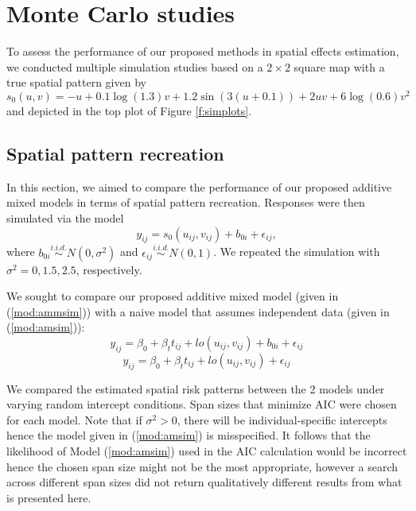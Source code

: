 	\section{Monte Carlo studies}
	To assess the performance of our proposed methods in spatial effects estimation, we conducted multiple simulation studies based on a $2\times 2$ square map with a true  spatial pattern given by
	\begin{equation}\label{eq:nlsim}
	s_0(u,v) = -u + 0.1\log(1.3)v+1.2\sin(3(u+0.1))+2uv+ 6\log(0.6)v^2
	\end{equation}
	and depicted in the top plot of Figure \ref{f:simplots}. 
	
	\subsection{Spatial pattern recreation}
	In this section, we aimed to compare the performance of our proposed additive mixed models in terms of spatial pattern recreation. Responses were then simulated via the model
	\begin{equation}\label{eq:sim3}
	y_{ij} = s_0(u_{ij},v_{ij}) + b_{0i} + \epsilon_{ij},
	\end{equation}
	where $b_{0i} \stackrel{i.i.d.}{\sim} N(0,\sigma^2)$ and $\epsilon_{ij} \stackrel{i.i.d.}{\sim} N(0,1)$. We repeated the simulation with $\sigma^2=0,1.5,2.5$, respectively. %
	
	
	We sought to compare our proposed additive mixed model (given in (\ref{mod:ammsim})) with a naive model that assumes independent data (given in (\ref{mod:amsim})):
	\begin{equation}\label{mod:ammsim}
	y_{ij} = \beta_0 + \beta_t t_{ij} + lo(u_{ij},v_{ij}) + b_{0i} + \epsilon_{ij}
	\end{equation}
	\begin{equation}\label{mod:amsim}
	y_{ij} = \beta_0 + \beta_t t_{ij} + lo(u_{ij},v_{ij}) + \epsilon_{ij}
	\end{equation}
	
	We compared the estimated spatial risk patterns between the 2 models under varying random intercept conditions. Span sizes that minimize AIC \citep{akaike1998information} were chosen for each model. Note that if $\sigma^2>0$, there will be individual-specific intercepts hence the model given in (\ref{mod:amsim}) is misspecified. It follows that the likelihood of Model (\ref{mod:amsim}) used in the AIC calculation would be incorrect hence the chosen span size might not be the most appropriate, however a search across different span sizes did not return qualitatively different results from what is presented here. 
	
